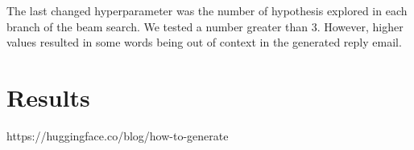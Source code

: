 \documentclass[letterpaper]{article}
\begin{document}
The last changed hyperparameter was the number of hypothesis explored in each branch of the beam search. We tested a number greater than \num{3}. However, higher values resulted in some words being out of context in the generated reply email.


\section{Results}



https://huggingface.co/blog/how-to-generate





\end{document}
